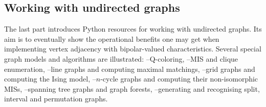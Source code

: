 % 
%
%

\begin{partbacktext}
\part{Working with undirected graphs}
\noindent The last part introduces Python resources for working with undirected graphs. Its aim is to eventually show the operational benefits one may get when implementing vertex adjacency with bipolar-valued characteristics. Several special graph models and algorithms are illustrated: --Q-coloring, --MIS and clique enumeration, --line graphs and computing maximal matchings, --grid graphs and computing the Ising model, --$n$-cycle graphs and computing their non-isomorphic MISs, --spanning tree graphs and graph forests, --generating and recognising split, interval and permutation graphs.
\end{partbacktext}